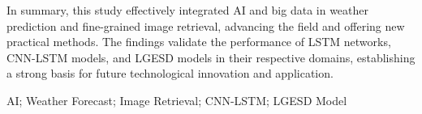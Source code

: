 \begin{titlepage}
\begin{enabstract}
    In summary, this study effectively integrated AI and big data in weather prediction and fine-grained image retrieval, advancing the field and offering new practical methods. The findings validate the performance of LSTM networks, CNN-LSTM models, and LGESD models in their respective domains, establishing a strong basis for future technological innovation and application.
    
    \begin{keyworden}
    AI; Weather Forecast; Image Retrieval; CNN-LSTM; LGESD Model
    \end{keyworden}
    
    \addabstractcontenten
    \end{enabstract}
\end{titlepage}



